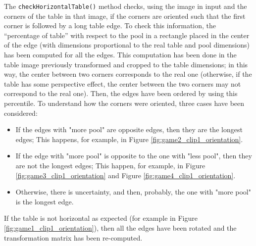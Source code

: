The \texttt{checkHorizontalTable()} method checks, using the image in input and the corners of the table in that image, if the corners are oriented such that the first corner is followed by a long table edge. To check this information, the “percentage of table” with respect to the pool in a rectangle placed in the center of the edge (with dimensions proportional to the real table and pool dimensions) has been computed for all the edges. This computation has been done in the table image previously transformed and cropped to the table dimensions; in this way, the center between two corners corresponds to the real one (otherwise, if the table has some perspective effect, the center between the two corners may not correspond to the real one). Then, the edges have been ordered by using this percentile. To understand how the corners were oriented, three cases have been considered:
\begin{itemize}
	\item If the edges with "more pool" are opposite edges, then they are the longest edges; This happens, for example, in Figure \ref{fig:game2_clip1_orientation}.
	\item If the edge with "more pool" is opposite to the one with "less pool", then they are not the longest edges; This happen, for example, in Figure \ref{fig:game3_clip1_orientation} and Figure \ref{fig:game4_clip1_orientation}.
	\item Otherwise, there is uncertainty, and then, probably, the one with "more pool" is the longest edge.
\end{itemize}
If the table is not horizontal as expected (for example in Figure \ref{fig:game1_clip1_orientation}), then all the edges have been rotated and the transformation matrix has been re-computed.

